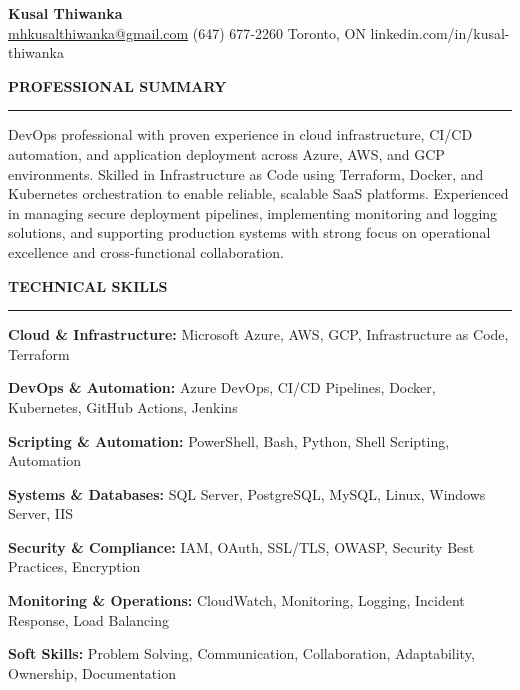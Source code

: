 \documentclass[10pt,letterpaper]{article}
\begin{document}
\begin{center}
{\LARGE\textbf{Kusal Thiwanka}}\\[3pt]
\href{mailto:mhkusalthiwanka@gmail.com}{mhkusalthiwanka@gmail.com}\hspace{2em}%
(647) 677{-}2260\hspace{2em}%
Toronto, ON\hspace{2em}
linkedin.com/in/kusal-thiwanka
\end{center}

\vspace{6pt}

\textbf{PROFESSIONAL SUMMARY}\\[-8pt]
\noindent\rule{\textwidth}{1pt}

\vspace{-2pt}

DevOps professional with proven experience in cloud infrastructure, CI/CD automation, and application deployment across Azure, AWS, and GCP environments. Skilled in Infrastructure as Code using Terraform, Docker, and Kubernetes orchestration to enable reliable, scalable SaaS platforms. Experienced in managing secure deployment pipelines, implementing monitoring and logging solutions, and supporting production systems with strong focus on operational excellence and cross-functional collaboration.

\vspace{8pt}

\textbf{TECHNICAL SKILLS}\\[-8pt]
\noindent\rule{\textwidth}{1pt}

\vspace{-2pt}

\textbf{Cloud \& Infrastructure:} Microsoft Azure, AWS, GCP, Infrastructure as Code, Terraform

\textbf{DevOps \& Automation:} Azure DevOps, CI/CD Pipelines, Docker, Kubernetes, GitHub Actions, Jenkins

\textbf{Scripting \& Automation:} PowerShell, Bash, Python, Shell Scripting, Automation

\textbf{Systems \& Databases:} SQL Server, PostgreSQL, MySQL, Linux, Windows Server, IIS

\textbf{Security \& Compliance:} IAM, OAuth, SSL/TLS, OWASP, Security Best Practices, Encryption

\textbf{Monitoring \& Operations:} CloudWatch, Monitoring, Logging, Incident Response, Load Balancing

\textbf{Soft Skills:} Problem Solving, Communication, Collaboration, Adaptability, Ownership, Documentation
\end{document}
